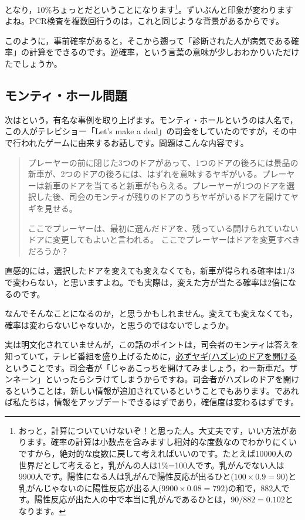 \documentclass{ltjsbook}
\begin{document}
となり，10\%ちょっとだということになります\footnote{おっと，計算についていけないぞ！と思った人。大丈夫です，いい方法があります。確率の計算は小数点を含みますし相対的な度数なのでわかりにくいですから，絶対的な度数に戻して考えればいいのです。たとえば10000人の世界だとして考えると，乳がんの人は1\%=100人です。乳がんでない人は9900人です。陽性になる人は乳がんで陽性反応が出るひと($100\times0.9=90$)と乳がんじゃないのに陽性反応が出る人($9900\times0.08=792$)の和で，882人です。陽性反応が出た人の中で本当に乳がんであるひとは，$90/882=0.102$となります。}。ずいぶんと印象が変わりますよね。PCR検査を複数回行うのは，これと同じような背景があるからです。

このように，事前確率があると，そこから遡って「診断された人が病気である確率」の計算をできるのです。逆確率，という言葉の意味が少しおわかりいただけたでしょうか。

\subsection{モンティ・ホール問題}

次はという，有名な事例を取り上げます。モンティ・ホールというのは人名で，この人がテレビショー「Let's make a deal」の司会をしていたのですが，その中で行われたゲームに由来するお話しです。問題はこんな内容です。

\begin{quotation}
	プレーヤーの前に閉じた3つのドアがあって、1つのドアの後ろには景品の新車が、2つのドアの後ろには、はずれを意味するヤギがいる。プレーヤーは新車のドアを当てると新車がもらえる。プレーヤーが1つのドアを選択した後、司会のモンティが残りのドアのうちヤギがいるドアを開けてヤギを見せる。

	ここでプレーヤーは、最初に選んだドアを、残っている開けられていないドアに変更してもよいと言われる。
	ここでプレーヤーはドアを変更すべきだろうか？
\end{quotation}

直感的には，選択したドアを変えても変えなくても，新車が得られる確率は1/3で変わらない，と思いますよね。でも実際は，変えた方が当たる確率は2倍になるのです。

なんでそんなことになるのか，と思うかもしれません。変えても変えなくても，確率は変わらないじゃないか，と思うのではないでしょうか。

実は明文化されていませんが，この話のポイントは，司会者のモンティは答えを知っていて，テレビ番組を盛り上げるために，\underline{必ずヤギ(ハズレ)のドアを開ける}ということです。司会者が「じゃあこっちを開けてみましょう，わー新車だ。ザンネーン」といったらシラけてしまうからですね。司会者がハズレのドアを開けるということは，新しい情報が追加されているということでもあります。であれば私たちは，情報をアップデートできるはずであり，確信度は変わるはずです。
\end{document}
